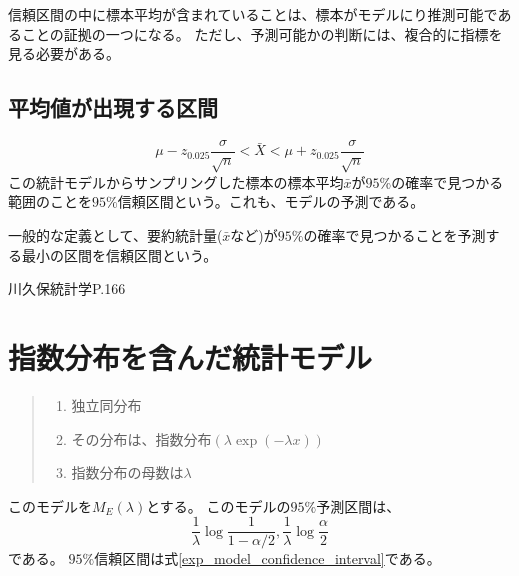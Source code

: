 信頼区間の中に標本平均が含まれていることは、標本がモデルにり推測可能であることの証拠の一つになる。
ただし、予測可能かの判断には、複合的に指標を見る必要がある。

\subsection{平均値が出現する区間}
\begin{equation*}
    \mu - z_{0.025} \frac{\sigma}{\sqrt{n}} < \bar{X} < \mu + z_{0.025} \frac{\sigma}{\sqrt{n}}
\end{equation*}
この統計モデルからサンプリングした標本の標本平均$\bar{x}$が$95\%$の確率で見つかる範囲のことを$95\%$信頼区間という。これも、モデルの予測である。

一般的な定義として、要約統計量($\bar{x}$など)が$95\%$の確率で見つかることを予測する最小の区間を信頼区間という。

\fi

 川久保統計学P.166
 \fi









\section{指数分布を含んだ統計モデル}
\begin{quote}
    \begin{enumerate}[(1)]
    \item 独立同分布
    \item その分布は、指数分布$(\lambda\exp{(-\lambda x)})$
    \item 指数分布の母数は$\lambda$
    \end{enumerate}
\end{quote}
このモデルを$M_E(\lambda)$とする。
このモデルの$95\%$予測区間は、
\begin{equation*}
    \frac{1}{\lambda} \log\frac{1}{1-\alpha/2} ,\frac{1}{\lambda}\log\frac{\alpha}{2}    
\end{equation*}
である。
$95\%$信頼区間は式\ref{exp_model_confidence_interval}である。


